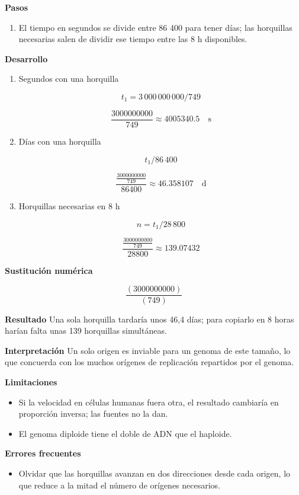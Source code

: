 \documentclass{book}
\begin{document}
\begin{tcolorbox}[title={Problema resuelto}, studiumworked, breakable]
\noindent\textbf{Pasos}
\begin{enumerate}
\item
El tiempo en segundos se divide entre 86 400 para tener días; las horquillas necesarias salen de dividir ese tiempo entre las 8 h disponibles.

\end{enumerate}

\noindent\textbf{Desarrollo}
\begin{enumerate}
\item
Segundos con una horquilla


\[
t_1 = 3\,000\,000\,000 / 749
\]

\[
\frac{3000000000}{749} \approx 4005340.5\quad \mathrm{s}
\]
\item
Días con una horquilla


\[
t_1 / 86\,400
\]

\[
\frac{\frac{3000000000}{749}}{86400} \approx 46.358107\quad \mathrm{d}
\]
\item
Horquillas necesarias en 8 h


\[
n = t_1 / 28\,800
\]

\[
\frac{\frac{3000000000}{749}}{28800} \approx 139.07432
\]
\end{enumerate}

\noindent\textbf{Sustitución numérica}

\[
\frac{\left(3000000000\right)}{\left(749\right)}
\]

\noindent\textbf{Resultado}
Una sola horquilla tardaría unos 46,4 días; para copiarlo en 8 horas harían falta unas 139 horquillas simultáneas.


\noindent\textbf{Interpretación}
Un solo origen es inviable para un genoma de este tamaño, lo que concuerda con los muchos orígenes de replicación repartidos por el genoma.


\noindent\textbf{Limitaciones}
\begin{itemize}
\item Si la velocidad en células humanas fuera otra, el resultado cambiaría en proporción inversa; las fuentes no la dan.
\item El genoma diploide tiene el doble de ADN que el haploide.
\end{itemize}

\noindent\textbf{Errores frecuentes}
\begin{itemize}
\item Olvidar que las horquillas avanzan en dos direcciones desde cada origen, lo que reduce a la mitad el número de orígenes necesarios.
\end{itemize}
\end{tcolorbox}
\end{document}
